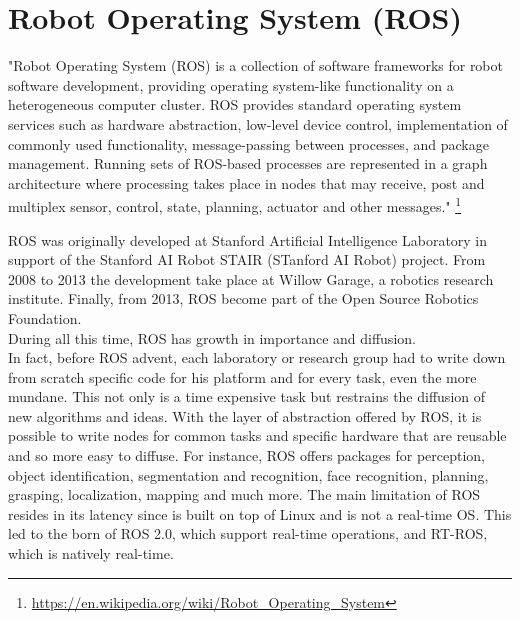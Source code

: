 \documentclass[pdftex,12pt,a4paper]{report}
\begin{document}
\newpage
\section{Robot Operating System (ROS)}
"Robot Operating System (ROS) is a collection of software frameworks for robot software development, providing operating system-like functionality on a heterogeneous computer cluster. ROS provides standard operating system services such as hardware abstraction, low-level device control, implementation of commonly used functionality, message-passing between processes, and package management. Running sets of ROS-based processes are represented in a graph architecture where processing takes place in nodes that may receive, post and multiplex sensor, control, state, planning, actuator and other messages." \footnote{\url{https://en.wikipedia.org/wiki/Robot_Operating_System}}
\newline

\noindent ROS was originally developed at Stanford Artificial Intelligence Laboratory in support of the Stanford AI Robot STAIR (STanford AI Robot) project. From 2008 to 2013 the development take place at Willow Garage, a robotics research institute. Finally, from 2013, ROS become part of the Open Source Robotics Foundation.\\
During all this time, ROS has growth in importance and diffusion. \\
In fact, before ROS advent, each laboratory or research group had to write down from scratch specific code for his platform and for every task, even the more mundane. This not only is a time expensive task but restrains the diffusion of new algorithms and ideas.
With the layer of abstraction offered by ROS, it is possible to write nodes for common tasks and specific hardware that are reusable and so more easy to diffuse. For instance, ROS offers packages for perception, object identification, segmentation and recognition, face recognition, planning, grasping, localization, mapping and much more. The main limitation of ROS resides in its latency since is built on top of Linux and is not a real-time OS. This led to the born of ROS 2.0, which support real-time operations, and RT-ROS, which is natively real-time. %
\end{document}
